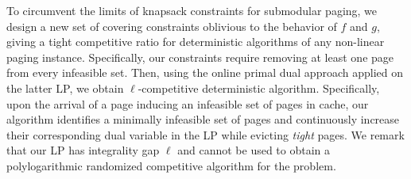 \documentclass[11pt]{article}
\newcommand{\comment}[1]{}
\newcommand{\cP}{{\mathcal{P}}}
\begin{document}
{To circumvent the limits of knapsack constraints for submodular paging, we design a new set of covering constraints oblivious to the behavior of $f$ and $g$, giving a tight competitive ratio for deterministic algorithms of any non-linear paging instance. Specifically, our constraints require removing at least one page from every infeasible set. Then, using the online primal dual approach applied on the latter LP, we obtain $\ell$-competitive deterministic algorithm. Specifically, upon the arrival of a page inducing an infeasible set of pages in cache, our algorithm identifies a minimally infeasible set of pages and continuously increase their corresponding dual variable in the LP while evicting {\em tight} pages.  %
We remark that our LP has integrality gap $\ell$ and cannot be used to obtain a polylogarithmic randomized competitive algorithm for the problem.  

}



\comment{

Our algorithm exploits the non-linearity of the feasibility function $f$ to obtain a simple and elegant algorithm for the general (weighted) model with arbitrary page costs. Specifically, we first design an algorithm   for the unweighted problem. Then, for solving a weighted instance online, we construct a reduced unweighted instance by transforming the feasibility function. We simulate the unweighted algorithm on this reduced instance, in an online fashion using multiple {\em sub-time points}. This surprising use of reduced  non-linear feasibility functions to tackle weighted instances, simplifies the analysis and gives the tight bound for generalized paging shown in \Cref{thm:generalized}.  This technique may be useful in other online settings. 

}




\end{document}

